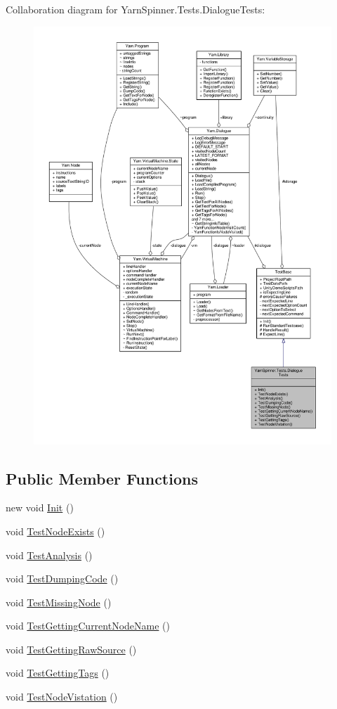 Collaboration diagram for Yarn\-Spinner.\-Tests.\-Dialogue\-Tests\-:
\nopagebreak
\begin{figure}[H]
\begin{center}
\leavevmode
\includegraphics[width=350pt]{a00723}
\end{center}
\end{figure}
\subsection*{Public Member Functions}
\begin{DoxyCompactItemize}
\item 
new void \hyperlink{a00090_a49813a64c710540348c15365a672e675}{Init} ()
\item 
void \hyperlink{a00090_a9d4171827bf3eba4c6ae52760a475f45}{Test\-Node\-Exists} ()
\item 
void \hyperlink{a00090_a40b0efb3cac1715b44640c29988139f1}{Test\-Analysis} ()
\item 
void \hyperlink{a00090_a111f0f8418baaeaf83cfb422c90210e0}{Test\-Dumping\-Code} ()
\item 
void \hyperlink{a00090_a013d5e3847b9d716b39aa925d70b99fd}{Test\-Missing\-Node} ()
\item 
void \hyperlink{a00090_afbb342ea64e33ee19d42a6a2c949592a}{Test\-Getting\-Current\-Node\-Name} ()
\item 
void \hyperlink{a00090_a16ed34de323da529e1a17670f556791c}{Test\-Getting\-Raw\-Source} ()
\item 
void \hyperlink{a00090_abb7bc5876ca4f37e93c6ac40bbd0e3b7}{Test\-Getting\-Tags} ()
\item 
void \hyperlink{a00090_a9c0d2732044b273929dbce35358a1906}{Test\-Node\-Vistation} ()
\end{DoxyCompactItemize}
